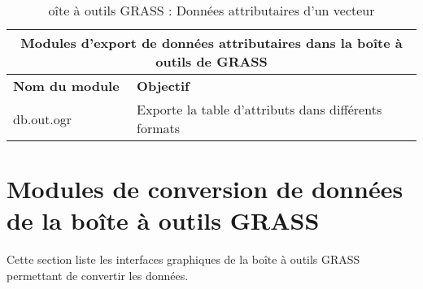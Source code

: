 \begin{table}[H]
\centering
 \begin{tabular}{|p{4cm}|p{10cm}|}
  \hline \multicolumn{2}{|c|}{\textbf{Modules d'export de données attributaires dans la boîte à outils de GRASS}} \\
  \hline \textbf{Nom du module} & \textbf{Objectif} \\
  \hline db.out.ogr & Exporte la table d'attributs dans différents formats  \\
\hline
\end{tabular}
\caption{oîte à outils GRASS : Données attributaires d'un vecteur}
\end{table}

\section{Modules de conversion de données de la boîte à outils GRASS}

Cette section liste les interfaces graphiques de la boîte à outils GRASS permettant de convertir les données.

